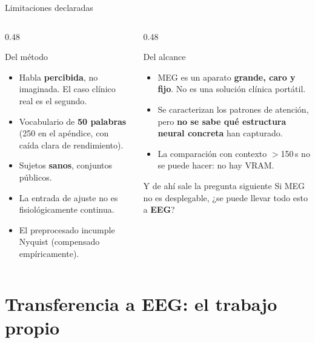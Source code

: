 \documentclass[aspectratio=169,10pt]{beamer}
\newcommand{\term}[1]{\textbf{\color{deepgreen}#1}}
\begin{document}
\begin{frame}[c]{Limitaciones declaradas}
  \small
  \begin{columns}[t,totalwidth=\linewidth]
    \begin{column}{0.48\linewidth}
      \begin{alertblock}{Del método}
        \begin{itemize}\footnotesize
          \item Habla \term{percibida}, no imaginada. El caso clínico real es el segundo.
          \item Vocabulario de \term{50 palabras} (250 en el apéndice, con caída clara de rendimiento).
          \item Sujetos \term{sanos}, conjuntos públicos.
          \item La entrada de ajuste no es fisiológicamente continua.
          \item El preprocesado incumple Nyquist (compensado empíricamente).
        \end{itemize}
      \end{alertblock}
    \end{column}
    \begin{column}{0.48\linewidth}
      \begin{block}{Del alcance}
        \begin{itemize}\footnotesize
          \item MEG es un aparato \term{grande, caro y fijo}. No es una solución clínica portátil.
          \item Se caracterizan los patrones de atención, pero \term{no se sabe qué estructura neural concreta} han capturado.
          \item La comparación con contexto $>$150\,s no se puede hacer: no hay VRAM.
        \end{itemize}
      \end{block}
      \vspace{1mm}
      \begin{exampleblock}{Y de ahí sale la pregunta siguiente}
        \footnotesize Si MEG no es desplegable, ¿se puede llevar todo esto a \term{EEG}?
      \end{exampleblock}
    \end{column}
  \end{columns}
\end{frame}

\section{Transferencia a EEG: el trabajo propio}
\end{document}
